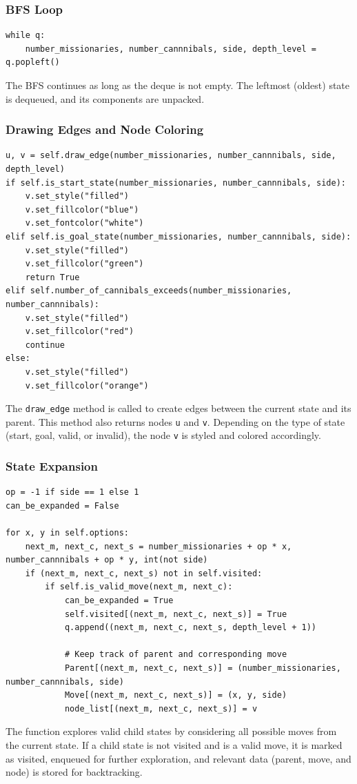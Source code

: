 \documentclass[12pt]{article}
\begin{document}
\subsubsection*{BFS Loop}
\begin{verbatim}
while q:
    number_missionaries, number_cannnibals, side, depth_level = q.popleft()
\end{verbatim}
\vspace*{5mm}
The BFS continues as long as the deque is not empty. The leftmost (oldest) state is dequeued, and its components are unpacked.

\subsubsection*{Drawing Edges and Node Coloring}
\begin{verbatim}
u, v = self.draw_edge(number_missionaries, number_cannnibals, side, depth_level)
if self.is_start_state(number_missionaries, number_cannnibals, side):
    v.set_style("filled")
    v.set_fillcolor("blue")
    v.set_fontcolor("white")
elif self.is_goal_state(number_missionaries, number_cannnibals, side):
    v.set_style("filled")
    v.set_fillcolor("green")
    return True
elif self.number_of_cannibals_exceeds(number_missionaries, number_cannnibals):
    v.set_style("filled")
    v.set_fillcolor("red")
    continue
else:
    v.set_style("filled")
    v.set_fillcolor("orange")
\end{verbatim}
\vspace*{5mm}
The \texttt{draw\_edge} method is called to create edges between the current state and its parent. This method also returns nodes \texttt{u} and \texttt{v}. Depending on the type of state (start, goal, valid, or invalid), the node \texttt{v} is styled and colored accordingly.
\subsubsection*{State Expansion}
\begin{verbatim}
op = -1 if side == 1 else 1
can_be_expanded = False

for x, y in self.options:
    next_m, next_c, next_s = number_missionaries + op * x, number_cannnibals + op * y, int(not side)
    if (next_m, next_c, next_s) not in self.visited:
        if self.is_valid_move(next_m, next_c):
            can_be_expanded = True
            self.visited[(next_m, next_c, next_s)] = True
            q.append((next_m, next_c, next_s, depth_level + 1))

            # Keep track of parent and corresponding move
            Parent[(next_m, next_c, next_s)] = (number_missionaries, number_cannnibals, side)
            Move[(next_m, next_c, next_s)] = (x, y, side)
            node_list[(next_m, next_c, next_s)] = v
\end{verbatim}
\vspace*{5mm}
The function explores valid child states by considering all possible moves from the current state. If a child state is not visited and is a valid move, it is marked as visited, enqueued for further exploration, and relevant data (parent, move, and node) is stored for backtracking.
\end{document}
